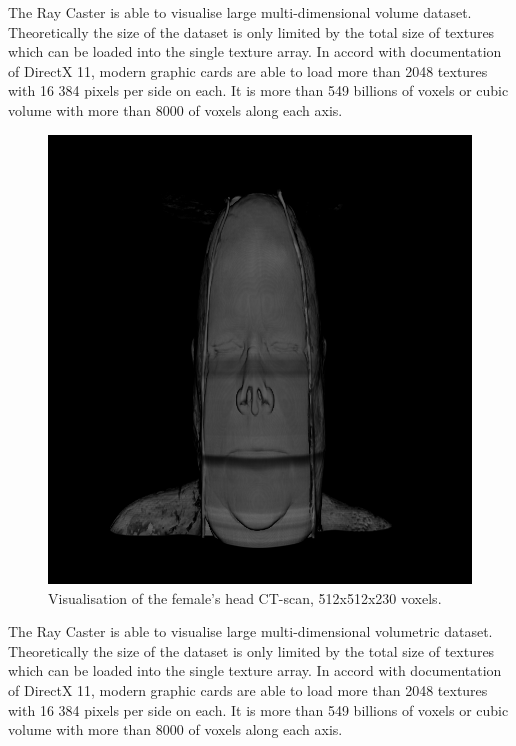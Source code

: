 \documentclass[twoside, english, 11pt]{report}
\begin{document}
The Ray Caster is able to visualise large multi-dimensional volume dataset. Theoretically the size of the dataset is only limited by the total size of textures which can be loaded into the single texture array. In accord with documentation of DirectX 11, modern graphic cards are able to load more than 2048 textures with 16 384 pixels per side on each. It is more than 549 billions of voxels or cubic volume with more than 8000 of voxels along each axis.\\

\begin{figure}[H]
\centerline{\includegraphics[scale = 0.5]{img/head}}
\caption{Visualisation of the female's head CT-scan, 512x512x230 voxels.\label{fig:head}}
\end{figure}

The Ray Caster is able to visualise large multi-dimensional volumetric dataset. Theoretically the size of the dataset is only limited by the total size of textures which can be loaded into the single texture array. In accord with documentation of DirectX 11, modern graphic cards are able to load more than 2048 textures with 16 384 pixels per side on each. It is more than 549 billions of voxels or cubic volume with more than 8000 of voxels along each axis.\\
\end{document}
